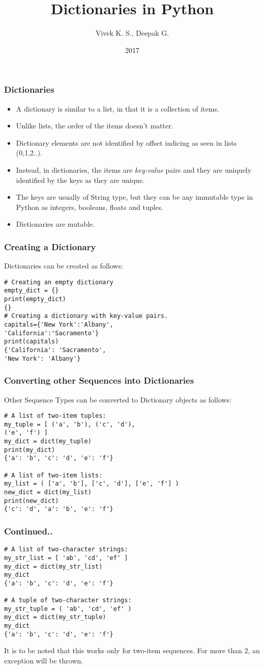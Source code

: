 \documentclass{beamer}
\title{Dictionaries in Python}
\author{Vivek K. S., Deepak G.}
\institute{Information Systems Decision Sciences (ISDS)\\
MUMA College of Business\\
University of South Florida \\
Tampa, Florida}
\date{2017}
\begin{document}
\frame{\titlepage}

\begin{frame}
\frametitle{Dictionaries}
\begin{itemize}
\item A dictionary is similar to a list, in that it is a collection of items.
\item Unlike lists, the order of the items doesn't matter.
\item Dictionary elements are not identified by offset indicing as seen in lists (0,1,2..).
\item Instead, in dictionaries, the items are \textit{key-value} pairs and they are uniquely identified by the keys as they are unique. 
\item The keys are usually of String type, but they can be any immutable type in Python as integers, booleans, floats and tuples.
\item Dictionaries are mutable.
\end{itemize}
\end{frame}

\begin{frame}[fragile]
\frametitle{Creating a Dictionary}
Dictionaries can be created as follows:
\begin{lstlisting}
# Creating an empty dictionary
empty_dict = {}
print(empty_dict)
{}
# Creating a dictionary with key-value pairs.
capitals={'New York':'Albany',
'California':'Sacramento'}
print(capitals)
{'California': 'Sacramento', 
'New York': 'Albany'}
\end{lstlisting}
\end{frame}

\begin{frame}[fragile]
\frametitle{Converting other Sequences into Dictionaries}
Other Sequence Types can be converted to Dictionary objects as follows:
\begin{lstlisting}
# A list of two-item tuples:
my_tuple = [ ('a', 'b'), ('c', 'd'), 
('e', 'f') ]
my_dict = dict(my_tuple)
print(my_dict)
{'a': 'b', 'c': 'd', 'e': 'f'}

# A list of two-item lists:
my_list = ( ['a', 'b'], ['c', 'd'], ['e', 'f'] )
new_dict = dict(my_list)
print(new_dict)
{'c': 'd', 'a': 'b', 'e': 'f'}
\end{lstlisting}
\end{frame}

\begin{frame}[fragile]
\frametitle{Continued..}
\begin{lstlisting}
# A list of two-character strings:
my_str_list = [ 'ab', 'cd', 'ef' ]
my_dict = dict(my_str_list)
my_dict
{'a': 'b', 'c': 'd', 'e': 'f'}

# A tuple of two-character strings:
my_str_tuple = ( 'ab', 'cd', 'ef' )
my_dict = dict(my_str_tuple)
my_dict
{'a': 'b', 'c': 'd', 'e': 'f'}
\end{lstlisting}
It is to be noted that this works only for two-item sequences. For more than 2, an exception will be thrown.
\end{frame}
\end{document}
